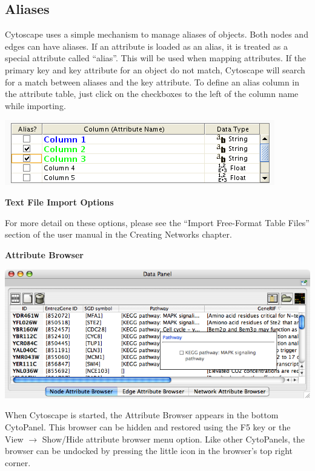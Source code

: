 \subsection{Aliases}

 Cytoscape uses a simple mechanism to manage aliases of objects. Both nodes and
edges can have aliases. If an attribute is loaded as an alias, it is treated as
a special attribute called ``alias''. This will be used when mapping
attributes. If the primary key and key attribute for an object do not match,
Cytoscape will search for a match between aliases and the key attribute. To
define an alias column in the attribute table, just click on the checkboxes to
the left of the column name while importing. 


 \includegraphics[width=\textwidth]{images/attribute_table_import_alias.png} 


 
\textbf{Text File Import Options}


 For more detail on these options, please see the ``Import Free-Format Table
Files'' section of the user manual in the Creating Networks chapter. 


 

\textbf{Attribute Browser}


 \includegraphics[width=\textwidth]{images/attribute_browser26.png} 


 When Cytoscape is started, the Attribute Browser appears in the bottom
CytoPanel. This browser can be hidden and restored using the F5 key or the View
$\rightarrow$ Show/Hide attribute browser menu option. Like other CytoPanels, the
browser can be undocked by pressing the little icon in the browser's
top right corner. 


